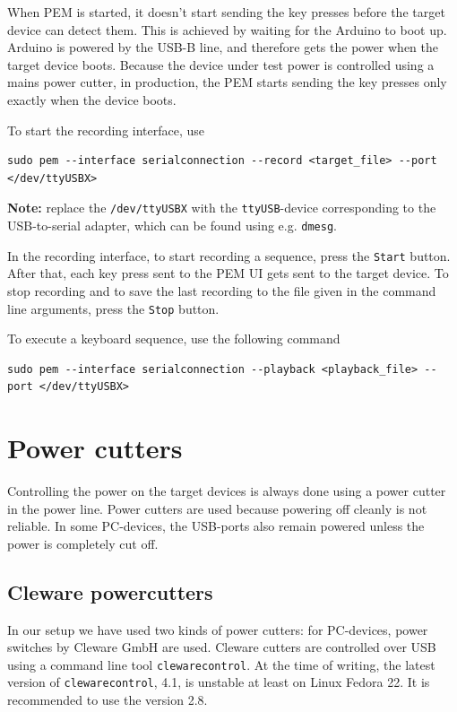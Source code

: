 \documentclass[a4paper,11pt]{article}
\newcommand{\note}{\textbf{Note: }}
\newcommand{\cmd}[1]{\texttt{#1}}
\begin{document}
When PEM is started, it doesn't start sending the key presses before the target device can detect them. This is achieved by waiting for the Arduino to boot up. Arduino is powered by the USB-B line, and therefore gets the power when the target device boots. Because the device under test power is controlled using a mains power cutter, in production, the PEM starts sending the key presses only exactly when the device boots.

To start the recording interface, use
\begin{lstlisting}
sudo pem --interface serialconnection --record <target_file> --port </dev/ttyUSBX>
\end{lstlisting}
\note replace the \cmd{/dev/ttyUSBX} with the \cmd{ttyUSB}-device corresponding to the USB-to-serial adapter, which can be found using e.g. \cmd{dmesg}.

In the recording interface, to start recording a sequence, press the \cmd{Start} button. After that, each key press sent to the PEM UI gets sent to the target device. To stop recording and to save the last recording to the file given in the command line arguments, press the  \cmd{Stop} button.

To execute a keyboard sequence, use the following command
\begin{lstlisting}
sudo pem --interface serialconnection --playback <playback_file> --port </dev/ttyUSBX>
\end{lstlisting}

\pagebreak

\section{Power cutters}
\label{powercutters}
Controlling the power on the target devices is always done using a power cutter in the power line. Power cutters are used because powering off cleanly is not reliable. In some PC-devices, the USB-ports also remain powered unless the power is completely cut off.

\subsection{Cleware powercutters}
\label{clewarecutters}
In our setup we have used two kinds of power cutters: for PC-devices, power switches by Cleware GmbH are used. Cleware cutters are controlled over USB using a command line tool \cmd{clewarecontrol}. At the time of writing, the latest version of \cmd{clewarecontrol}, 4.1, is unstable at least on Linux Fedora 22. It is recommended to use the version 2.8.
\end{document}
